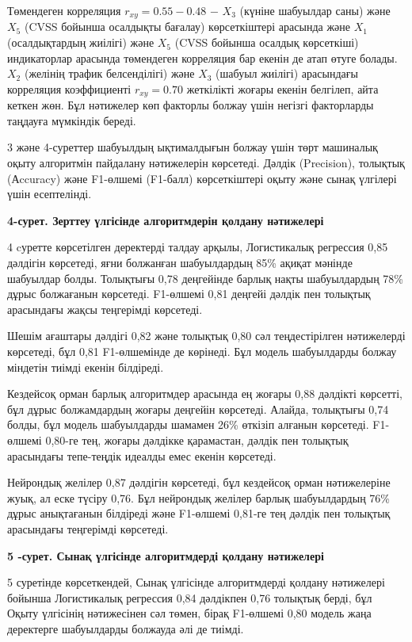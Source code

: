 \documentclass[
]{article}
\begin{document}
Төмендеген корреляция \(r_{xy} = 0.55 - 0.48\) − \(X_{3}\) (күніне
шабуылдар саны) және \(X_{5}\) (CVSS бойынша осалдықты бағалау)
көрсеткіштері арасында және \(X_{1}\) (осалдықтардың жиілігі) және
\(X_{5}\) (CVSS бойынша осалдық көрсеткіші) индикаторлар арасында
төмендеген корреляция бар екенін де атап өтуге болады. \(X_{2}\)
(желінің трафик белсенділігі) және \(X_{3}\) (шабуыл жиілігі) арасындағы
корреляция коэффициенті \(r_{xy} = 0.70\) жеткілікті жоғары екенін
белгілеп, айта кеткен жөн. Бұл нәтижелер көп факторлы болжау үшін
негізгі факторларды таңдауға мүмкіндік береді.

3 және 4-суреттер шабуылдың ықтималдығын болжау үшін төрт машиналық
оқыту алгоритмін пайдалану нәтижелерін көрсетеді. Дәлдік (Precision),
толықтық (Аccuracy) және F1-өлшемі (F1-балл) көрсеткіштері оқыту және
сынақ үлгілері үшін есептелінді.

\textbf{4-сурет. Зерттеу үлгісінде алгоритмдерін қолдану нәтижелері}

4 cуретте көрсетілген деректерді талдау арқылы, Логистикалық регрессия
0,85 дәлдігін көрсетеді, яғни болжанған шабуылдардың 85\% ақиқат мәнінде
шабуылдар болды. Толықтығы 0,78 деңгейінде барлық нақты шабуылдардың
78\% дұрыс болжағанын көрсетеді. F1-өлшемі 0,81 деңгейі дәлдік пен
толықтық арасындағы жақсы теңгерімді көрсетеді.

Шешім ағаштары дәлдігі 0,82 және толықтық 0,80 сәл теңдестірілген
нәтижелерді көрсетеді, бұл 0,81 F1-өлшемінде де көрінеді. Бұл модель
шабуылдарды болжау міндетін тиімді екенін білдіреді.

Кездейсоқ орман барлық алгоритмдер арасында ең жоғары 0,88 дәлдікті
көрсетті, бұл дұрыс болжамдардың жоғары деңгейін көрсетеді. Алайда,
толықтығы 0,74 болды, бұл модель шабуылдарды шамамен 26\% өткізіп
алғанын көрсетеді. F1-өлшемі 0,80-ге тең, жоғары дәлдікке қарамастан,
дәлдік пен толықтық арасындағы тепе-теңдік идеалды емес екенін
көрсетеді.

Нейрондық желілер 0,87 дәлдігін көрсетеді, бұл кездейсоқ орман
нәтижелеріне жуық, ал еске түсіру 0,76. Бұл нейрондық желілер барлық
шабуылдардың 76\% дұрыс анықтағанын білдіреді және F1-өлшемі 0,81-ге тең
дәлдік пен толықтық арасындағы теңгерімді көрсетеді.

\textbf{5 -сурет. Сынақ үлгісінде алгоритмдерді қолдану нәтижелері}

5 суретінде көрсеткендей, Сынақ үлгісінде алгоритмдерді қолдану
нәтижелері бойынша Логистикалық регрессия 0,84 дәлдікпен 0,76 толықтық
берді, бұл Оқыту үлгісінің нәтижесінен сәл төмен, бірақ F1-өлшемі 0,80
модель жаңа деректерге шабуылдарды болжауда әлі де тиімді.
\end{document}
